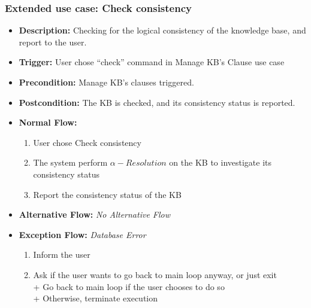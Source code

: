 \documentclass[../gr-final.tex]{subfiles}
\begin{document}
\subsubsection{Extended use case: Check consistency}
\begin{itemize}
  \item {\bfseries Description:} Checking for the logical
    consistency of the knowledge base, and report to the user.
  \item {\bfseries Trigger:} User chose ``check'' command in
    Manage KB's Clause use case
  \item {\bfseries Precondition:} Manage KB's clauses triggered.    
  \item {\bfseries Postcondition:} The KB is checked, and its
    consistency status is reported.

  \item {\bfseries Normal Flow:}
    \begin{enumerate}
      \item User chose Check consistency
      \item The system perform $\alpha-Resolution$ on the KB to
        investigate its consistency status
      \item Report the consistency status of the KB  
    \end{enumerate}
  \item {\bfseries Alternative Flow:} {\em No Alternative Flow}
  \item {\bfseries Exception Flow:} 
    {\em Database Error}
    \begin{enumerate}
      \item Inform the user
      \item Ask if the user wants to go back to main loop anyway,
        or just exit\\
        \indent + Go back to main loop if the user chooses to do
        so\\
        \indent + Otherwise, terminate execution
    \end{enumerate}
\end{itemize}
\end{document}
